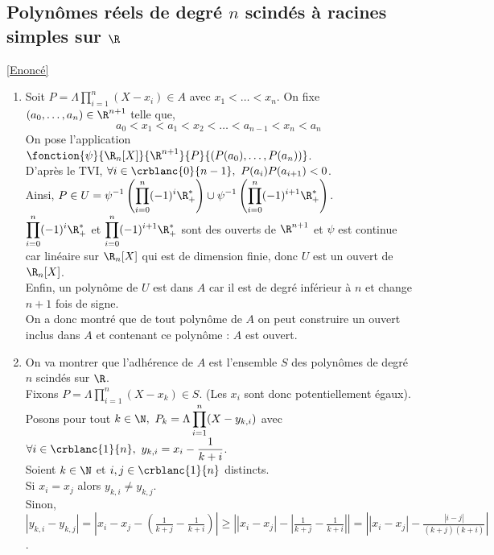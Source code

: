 \documentclass{book}
\begin{document}
	\subsection{Polynômes réels de degré $n$ scindés à racines simples sur $\R$ }
	\label{sec:polynomes-reels-de-degre-n-scindes-a-racines-simples-sur-r-etoile4}
	\textcolor{blue}{\hyperref[Polynômes réels de degré n scindés à racines simples sur R]{[Enoncé]}}\\
	\begin{enumerate}[leftmargin=*]
		\item Soit $P=\Lambda\displaystyle\prod\limits_{i=1}^n(X-x_i)\in A$ avec $x_1<\dots<x_n$. On fixe $(a_0,\dots,a_n)\in \R^{n+1}$ telle que,
		$$a_0<x_1<a_1<x_2<\dots<a_{n-1}<x_n<a_n$$
		On pose l'application $\fonction{\psi}{\R_n[X]}{\R^{n+1}}{P}{(P(a_0),\dots,P(a_n))}$.\\
		D'après le TVI, $\forall i\in \crblanc{0}{n-1},\ P(a_i)P(a_{i+1})<0$.\\
		Ainsi, $P\in U=\displaystyle\psi^{-1}\left(\prod\limits_{i=0}^n(-1)^i\R^*_+\right)\cup\psi^{-1}\left(\prod\limits_{i=0}^n(-1)^{i+1}\R^*_+\right)$.\\
		$\displaystyle\prod\limits_{i=0}^n(-1)^i\R^*_+$ et $\displaystyle\prod\limits_{i=0}^n(-1)^{i+1}\R^*_+$ sont des ouverts de $\R^{n+1}$ et $\psi$ est continue car linéaire sur $\R_n[X]$ qui est de dimension finie, donc $U$ est un ouvert de $\R_n[X]$.\\
		Enfin, un polynôme de $U$ est dans $A$ car il est de degré inférieur à $n$ et change $n+1$ fois de signe.\\
		On a donc montré que de tout polynôme de $A$ on peut construire un ouvert inclus dans $A$ et contenant ce polynôme : $A$ est ouvert.
		\item On va montrer que l'adhérence de $A$ est l'ensemble $S$ des polynômes de degré $n$ scindés sur $\R$.\\
		Fixons $P=\Lambda\displaystyle\prod\limits_{i=1}^n(X-x_k)\in S$. (Les $x_i$ sont donc potentiellement égaux).\\
		Posons pour tout $k\in \N,\ P_k=\Lambda\displaystyle\prod_{i=1}^n(X-y_{k,i})$ avec $\forall i\in \crblanc{1}{n},\ y_{k,i}=x_i-\displaystyle\frac{1}{k+i}$.\\
		Soient $k\in \N$ et $i,j\in \crblanc{1}{n}$ distincts.\\
		Si $x_i=x_j$ alors $y_{k,i}\ne y_{k,j}$.\\
		Sinon, $|y_{k,i}-y_{k,j}|=\displaystyle\left|x_i-x_j-\left(\frac{1}{k+j}-\frac{1}{k+i}\right)\right|\geq \left||x_i-x_j|-\left|\frac{1}{k+j}-\frac{1}{k+i}\right|\right|=\left||x_i-x_j|-\frac{|i-j|}{(k+j)(k+i)}\right|$.\\

\end{enumerate}
\end{document}
